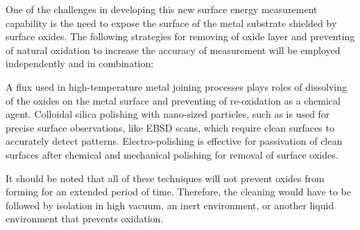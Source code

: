 One of the challenges in developing this new surface energy measurement capability is the need to expose the surface of the metal substrate shielded by surface oxides. The following strategies for removing of oxide layer and preventing of natural oxidation to increase the accuracy of measurement will be employed independently and in combination:
\begin{outline}
	\1 A flux used in high-temperature metal joining processes plays roles of dissolving of the oxides on the metal surface and preventing of re-oxidation as a chemical agent.
	\1 Colloidal silica polishing with nano-sized particles, such as is used for precise surface observations, like EBSD scans, which require clean surfaces to accurately detect patterns.
	\1 Electro-polishing is effective for passivation of clean surfaces after chemical and mechanical polishing for removal of surface oxides. 
\end{outline}
It should be noted that all of these techniques will not prevent oxides from forming for an extended period of time. Therefore, the cleaning would have to be followed by isolation in high vacuum, an inert environment, or another liquid environment that prevents oxidation.





